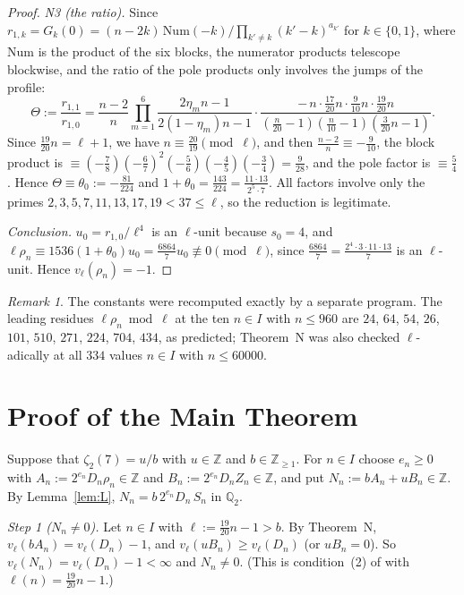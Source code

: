 \documentclass{amsart}
\theoremstyle{definition}
\theoremstyle{remark}
\newtheorem{remark}[theorem]{Remark}
\numberwithin{equation}{section}
\newcommand{\Z}{\mathbb{Z}}
\newcommand{\Q}{\mathbb{Q}}
\begin{document}
\begin{proof}
\emph{N3 (the ratio).} Since $r_{1,k}=G_k(0)=(n-2k)\,\mathrm{Num}(-k)/\prod_{k'\ne k}(k'-k)^{a_{k'}}$
for $k\in\{0,1\}$, where $\mathrm{Num}$ is the product of the six blocks, the
numerator products telescope blockwise, and the ratio of the pole products
only involves the jumps of the profile:
\[
  \Theta:=\frac{r_{1,1}}{r_{1,0}}
  =\frac{n-2}{n}\prod_{m=1}^{6}\frac{2\eta_mn-1}{2(1-\eta_m)n-1}\cdot
  \frac{-\,n\cdot\frac{17}{20}n\cdot\frac9{10}n\cdot\frac{19}{20}n}
  {(\frac n{20}-1)(\frac n{10}-1)(\frac3{20}n-1)} .
\]
Since $\frac{19}{20}n=\ell+1$, we have $n\equiv\frac{20}{19}\pmod\ell$, and
then $\frac{n-2}n\equiv-\frac9{10}$, the block product is
$\equiv(-\frac78)(-\frac67)^2(-\frac56)(-\frac45)(-\frac34)=\frac9{28}$, and the
pole factor is $\equiv\frac54$. Hence
$\Theta\equiv\theta_0:=-\frac{81}{224}$ and
$1+\theta_0=\frac{143}{224}=\frac{11\cdot13}{2^5\cdot7}$. All factors involve
only the primes $2,3,5,7,11,13,17,19<37\le\ell$, so the reduction is
legitimate.

\emph{Conclusion.} $u_0=r_{1,0}/\ell^4$ is an $\ell$-unit because $s_0=4$, and
$\ell\rho_n\equiv1536(1+\theta_0)u_0=\frac{6864}7u_0\not\equiv0\pmod\ell$,
since $\frac{6864}7=\frac{2^4\cdot3\cdot11\cdot13}7$ is an $\ell$-unit. Hence
$v_\ell(\rho_n)=-1$.
\end{proof}

\begin{remark}\label{rem:N-checks}
The constants were recomputed exactly by a separate program. The leading
residues $\ell\rho_n\bmod\ell$ at the ten $n\in I$ with $n\le960$ are $24$,
$64$, $54$, $26$, $101$, $510$, $271$, $224$, $704$, $434$, as predicted;
Theorem~N was also checked $\ell$-adically at all $334$ values $n\in I$ with
$n\le60000$.
\end{remark}

\section{Proof of the Main Theorem}\label{sec:main}

Suppose that $\zeta_2(7)=u/b$ with $u\in\Z$ and $b\in\Z_{\ge1}$. For $n\in I$
choose $e_n\ge0$ with $A_n:=2^{e_n}D_n\rho_n\in\Z$ and
$B_n:=2^{e_n}D_nZ_n\in\Z$, and put $N_n:=bA_n+uB_n\in\Z$. By
Lemma~\ref{lem:L}, $N_n=b\,2^{e_n}D_n\,S_n$ in $\Q_2$.

\emph{Step 1 ($N_n\ne0$).} Let $n\in I$ with $\ell:=\frac{19}{20}n-1>b$. By
Theorem~N, $v_\ell(bA_n)=v_\ell(D_n)-1$, and $v_\ell(uB_n)\ge v_\ell(D_n)$ (or
$uB_n=0$). So $v_\ell(N_n)=v_\ell(D_n)-1<\infty$ and $N_n\ne0$. (This is
condition~(2) of \cite[Lemma~2.2]{LS25} with $\ell(n)=\frac{19}{20}n-1$.)
\end{document}

